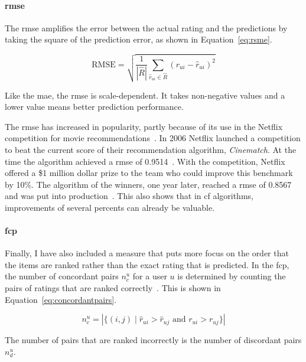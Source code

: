 \paragraph{\gls{rmse}}
The \gls{rmse} amplifies the error between the actual rating and the predictions by taking the square of the prediction error, as shown in Equation~\ref{eq:rsme}.

\begin{equation}
    \label{eq:rsme}
    \text{RMSE} = \sqrt{ \frac{1}{ |\hat{R}| }  \sum\limits_{\hat{r}_{ui} \in \hat{R}} (r_{ui} - \hat{r}_{ui})^2}
\end{equation}

Like the \gls{mae}, the \gls{rmse} is scale-dependent.
It takes non-negative values and a lower value means better prediction performance.

The \gls{rmse} has increased in popularity, partly because of its use in the Netflix competition for movie recommendations~\cite{su2009survey,zhou2008large}.
In 2006 Netflix launched a competition to beat the current score of their recommendation algorithm, \emph{Cinematch}.
At the time the algorithm achieved a \gls{rmse} of 0.9514~\cite{zhou2008large,bennett2007netflix}.
With the competition, Netflix offered a \$1 million dollar prize to the team who could improve this benchmark by 10\%.
The algorithm of the winners, one year later, reached a \gls{rmse} of 0.8567 and was put into production~\cite{zhou2008large,netflixprizeforum,netflixprizeleaderboard}.
This also shows that in \gls{cf} algorithms, improvements of several percents can already be valuable.

\paragraph{\gls{fcp}}
Finally, I have also included a measure that puts more focus on the order that the items are ranked rather than the exact rating that is predicted.
In the \gls{fcp}, the number of concordant pairs $n_{c}^{u}$ for a user $u$ is determined by counting the pairs of ratings that are ranked correctly~\cite{koren2013collaborative}.
This is shown in Equation~\ref{eq:concordantpairs}.

\begin{equation}
    \label{eq:concordantpairs}
    n_{c}^{u} = |\{(i,j) \mid \hat{r}_{ui} > \hat{r}_{uj} \text{ and } r_{ui} > r_{uj} \}|
\end{equation}

The number of pairs that are ranked incorrectly is the number of discordant pairs $n_{d}^u$.

